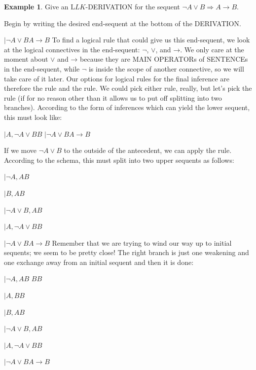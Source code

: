 \documentclass[10pt,a4paper]{article}
\newcommand*{\olup}[1]{\MakeUppercase{#1}}
\theoremstyle{plain}
\theoremstyle{definition}
\newtheorem{ex}[thm]{Example}
\theoremstyle{remark}
\providecommand{\AxiomC}[1]{}
\providecommand{\RightLabel}[1]{}
\providecommand{\fCenter}{}
\newenvironment{prooftree}{}{}
\providecommand{\lif}{\mathbin{\rightarrow}}
\providecommand{\Sequent}{\mathrel{\Rightarrow}}
\providecommand{\Log}{\ensuremath{\mathrm{L}}}
\providecommand{\LeftR}[1]{}
\providecommand{\RightR}[1]{}
\providecommand{\UnaryInf}{\ensuremath{\mid}}
\providecommand{\BinaryInf}{\ensuremath{\mid}}
\providecommand{\Weakening}{\mathrm{Wk}}
\providecommand{\RightR}{\mathrm{R}}
\providecommand{\LeftR}{\mathrm{L}}
\providecommand{\Axiom}{\mathrm{Ax}}
\begin{document}
\begin{ex}
Give an $\Log{LK}$-\olup{derivation} for the sequent $\lnot A \lor B
\Sequent A \lif B$.

Begin by writing the desired end-sequent at the bottom of the \olup{derivation}.
\begin{prooftree}
\AxiomC{}
\UnaryInf$\lnot A \lor B \fCenter A \lif B$
\end{prooftree}
To find a logical rule that could give us this end-sequent, we look at
the logical connectives in the end-sequent: $\lnot$, $\lor$, and
$\lif$. We only care at the moment about $\lor$ and $\lif$ because
they are \olup{main operator}s of \olup{sentence}s in the end-sequent,
while $\lnot$ is inside the scope of another connective, so we will
take care of it later. Our options for logical rules for the final
inference are therefore the \LeftR{\lor} rule and the \RightR{\lif}
rule. We could pick either rule, really, but let's pick the \RightR{\lif}
rule (if for no reason other than it allows us to put off
splitting into two branches). According to the form of \RightR{\lif}
inferences which can yield the lower sequent, this must look like:
\begin{prooftree}
\AxiomC{}
\UnaryInf$ A, \lnot A \lor B \fCenter B $
\RightLabel{\RightR{\lif}} \UnaryInf$ \lnot A \lor B \fCenter A \lif B $
\end{prooftree}

If we move $\lnot A \lor B$ to the outside of the antecedent, we can
apply the \LeftR{\lor} rule. According to the schema, this must split
into two upper sequents as follows:
\begin{prooftree}
\AxiomC{}
\UnaryInf$\lnot A, A \fCenter B$
\AxiomC{}
\UnaryInf$B, A \fCenter B$
\RightLabel{\LeftR{\lor}}
\BinaryInf$ \lnot A \lor B, A \fCenter B $
\RightLabel{\RightR{\Exchange}}
\UnaryInf$ A, \lnot A \lor B \fCenter B $
\RightLabel{\RightR{\lif}}
\UnaryInf$ \lnot A \lor B \fCenter A \lif B $
\end{prooftree}
Remember that we are trying to wind our way up to initial sequents; we
seem to be pretty close!{} The right branch is just one weakening and
one exchange away from an initial sequent and then it is done:
\begin{prooftree}
\AxiomC{}
\UnaryInf$\lnot A, A \fCenter B$
\Axiom$B \fCenter B$
\RightLabel{\LeftR{\Weakening}}
\UnaryInf$A, B \fCenter B$
\RightLabel{\LeftR{\Exchange}}
\UnaryInf$B, A \fCenter B$
\RightLabel{\LeftR{\lor}}
\BinaryInf$\lnot A \lor B, A \fCenter B $
\RightLabel{\RightR{\Exchange}}
\UnaryInf$ A, \lnot A \lor B \fCenter B $
\RightLabel{\RightR{\lif}}
\UnaryInf$ \lnot A \lor B \fCenter A \lif B $
\end{prooftree}


\end{ex}
\end{document}
